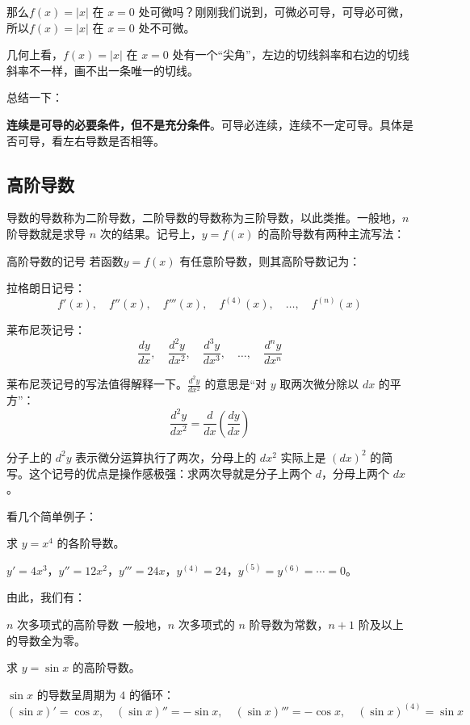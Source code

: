 那么$f(x) = |x|$ 在 $x = 0$ 处可微吗？刚刚我们说到，可微必可导，可导必可微，所以$f(x) = |x|$ 在 $x = 0$ 处不可微。

几何上看，$f(x)=|x|$ 在 $x=0$ 处有一个“尖角”，左边的切线斜率和右边的切线斜率不一样，画不出一条唯一的切线。

总结一下：

\textbf{连续是可导的必要条件，但不是充分条件}。可导必连续，连续不一定可导。具体是否可导，看左右导数是否相等。

\subsection{高阶导数}

导数的导数称为二阶导数，二阶导数的导数称为三阶导数，以此类推。一般地，$n$ 阶导数就是求导 $n$ 次的结果。记号上，$y = f(x)$ 的高阶导数有两种主流写法：
\begin{definition}{高阶导数的记号}{}
  若函数$y = f(x)$ 有任意阶导数，则其高阶导数记为：

  拉格朗日记号：
  \[
  f'(x),\quad f''(x),\quad f'''(x),\quad f^{(4)}(x),\quad \dots,\quad f^{(n)}(x)
  \]
  
  莱布尼茨记号：
  \[
  \frac{dy}{dx},\quad \frac{d^2y}{dx^2},\quad \frac{d^3y}{dx^3},\quad \dots,\quad \frac{d^ny}{dx^n}
  \]
  
\end{definition}

莱布尼茨记号的写法值得解释一下。$\frac{d^2y}{dx^2}$ 的意思是“对 $y$ 取两次微分除以 $dx$ 的平方”：
\[
\frac{d^2y}{dx^2} = \frac{d}{dx} (\frac{dy}{dx})
\]

分子上的 $d^2y$ 表示微分运算执行了两次，分母上的 $dx^2$ 实际上是 $(dx)^2$ 的简写。这个记号的优点是操作感极强：求两次导就是分子上两个 $d$，分母上两个 $dx$。

看几个简单例子：

\begin{myexample}
  求 $y = x^4$ 的各阶导数。

  $y' = 4x^3$，$y'' = 12x^2$，$y''' = 24x$，$y^{(4)} = 24$，$y^{(5)} = y^{(6)} = \cdots = 0$。

\end{myexample}

由此，我们有：
\begin{theorem}{$n$ 次多项式的高阶导数}{}
  一般地，$n$ 次多项式的 $n$ 阶导数为常数，$n+1$ 阶及以上的导数全为零。
\end{theorem}


\begin{myexample}
  求 $y = \sin x$ 的高阶导数。

  $\sin x$ 的导数呈周期为 $4$ 的循环：
  \[
  (\sin x)' = \cos x,\quad (\sin x)'' = -\sin x,\quad (\sin x)''' = -\cos x,\quad (\sin x)^{(4)} = \sin x
  \]
\end{myexample}

